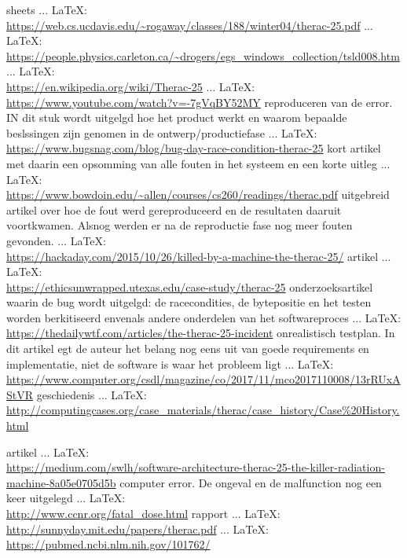 \begin{thebibliography}{99}
{{{{sheets
 ... \LaTeX:\\ \url{https://web.cs.ucdavis.edu/~rogaway/classes/188/winter04/therac-25.pdf}
 ... \LaTeX:\\ \url{https://people.physics.carleton.ca/~drogers/egs_windows_collection/tsld008.htm}
\cite{}
 ... \LaTeX:\\ \url{https://en.wikipedia.org/wiki/Therac-25}
 ... \LaTeX:\\ \url{https://www.youtube.com/watch?v=-7gVqBY52MY}
\cite{}
reproduceren van de error. IN dit stuk wordt uitgelgd hoe het product werkt en waarom bepaalde beslssingen zijn genomen in de ontwerp/productiefase
 ... \LaTeX:\\ \url{https://www.bugsnag.com/blog/bug-day-race-condition-therac-25}
kort artikel met daarin een opsomming van alle fouten in het systeem en een korte uitleg
 ... \LaTeX:\\ \url{https://www.bowdoin.edu/~allen/courses/cs260/readings/therac.pdf}
uitgebreid artikel over hoe de fout werd gereproduceerd en de resultaten daaruit voortkwamen. Alsnog werden er na de reproductie fase nog meer fouten gevonden.
 ... \LaTeX:\\ \url{https://hackaday.com/2015/10/26/killed-by-a-machine-the-therac-25/}
artikel
 ... \LaTeX:\\ \url{https://ethicsunwrapped.utexas.edu/case-study/therac-25}
onderzoeksartikel waarin de bug wordt uitgelgd: de racecondities, de bytepositie en het testen worden berkitiseerd envenals andere onderdelen van het softwareproces
 ... \LaTeX:\\ \url{https://thedailywtf.com/articles/the-therac-25-incident}
\cite{}
onrealistisch testplan. In dit artikel egt de auteur het belang nog eens uit van goede requirements en implementatie, niet de software is waar het probleem ligt
 ... \LaTeX:\\ \url{https://www.computer.org/csdl/magazine/co/2017/11/mco2017110008/13rRUxAStVR}
\cite{}
geschiedenis
 ... \LaTeX:\\ \url{http://computingcases.org/case_materials/therac/case_history/Case%20History.html}

artikel
 ... \LaTeX:\\ \url{https://medium.com/swlh/software-architecture-therac-25-the-killer-radiation-machine-8a05e0705d5b}
computer error. De ongeval en de malfunction nog een keer uitgelegd
 ... \LaTeX:\\ \url{http://www.ccnr.org/fatal_dose.html}
rapport
 ... \LaTeX:\\ \url{http://sunnyday.mit.edu/papers/therac.pdf}
 ... \LaTeX:\\ \url{https://pubmed.ncbi.nlm.nih.gov/101762/}

}}}}
\end{thebibliography}
